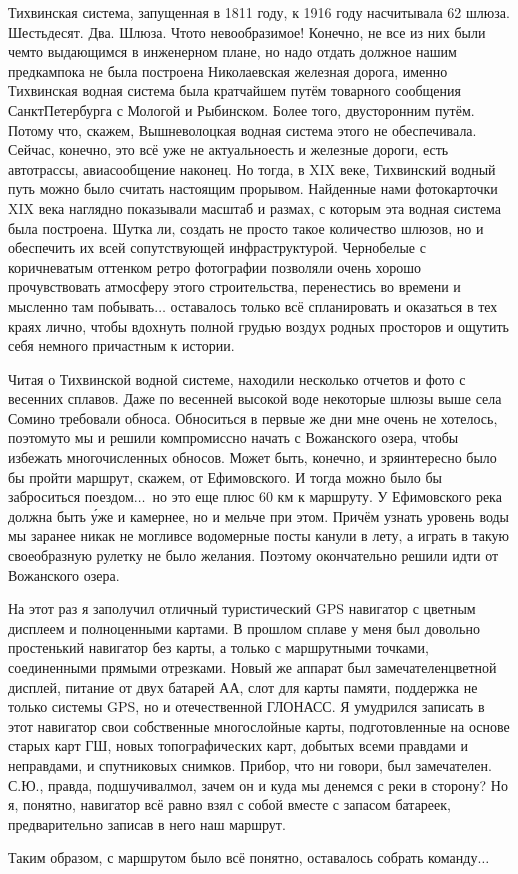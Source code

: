 Тихвинская система, запущенная в 1811 году, к 1916 году насчитывала 62 шлюза. Шестьдесят. Два. Шлюза. Что\sdash то невообразимое! Конечно, не все из них были чем\sdash то выдающимся в инженерном плане, но надо отдать должное нашим предкам\mdash пока не была построена Николаевская железная дорога, именно Тихвинская водная система была кратчайшем путём товарного сообщения Санкт\sdash Петербурга с Мологой и Рыбинском. Более того, двусторонним путём. Потому что, скажем, Вышневолоцкая водная система этого не обеспечивала. Сейчас, конечно, это всё уже не актуально\mdash есть и железные дороги, есть автотрассы, авиасообщение наконец. Но тогда, в XIX веке, Тихвинский водный путь можно было считать настоящим прорывом. Найденные нами фотокарточки XIX века наглядно показывали масштаб и размах, с которым эта водная система была построена. Шутка ли, создать не просто такое количество шлюзов, но и обеспечить их всей сопутствующей инфраструктурой. Черно\sdash белые с коричневатым оттенком ретро фотографии позволяли очень хорошо прочувствовать атмосферу этого строительства, перенестись во времени и мысленно там побывать$\ldots$ оставалось только всё спланировать и оказаться в тех краях лично, чтобы вдохнуть полной грудью воздух родных просторов и ощутить себя немного причастным к истории.

Читая о Тихвинской водной системе, находили несколько отчетов и фото с весенних сплавов. Даже по весенней высокой воде некоторые шлюзы выше села Сомино требовали обноса. Обноситься в первые же дни мне очень не хотелось, поэтому\sdash то мы и решили компромиссно начать с Вожанского озера, чтобы избежать многочисленных обносов. Может быть, конечно, и зря\mdash интересно было бы пройти маршрут, скажем, от Ефимовского. И тогда можно было бы заброситься поездом$\ldots$~но это еще плюс 60 км к маршруту. У Ефимовского река должна быть \'{у}же и камернее, но и мельче при этом. Причём узнать уровень воды мы заранее никак не могли\mdash все водомерные посты канули в лету, а играть в такую своеобразную рулетку не было желания. Поэтому окончательно решили идти от Вожанского озера. 

На этот раз я заполучил отличный туристический GPS навигатор с цветным дисплеем и полноценными картами. В прошлом сплаве у меня был довольно простенький навигатор без карты, а только с маршрутными точками, соединенными прямыми отрезками. Новый же аппарат был замечателен\mdash цветной дисплей, питание от двух батарей АА, слот для карты памяти, поддержка не только системы GPS, но и отечественной ГЛОНАСС. Я умудрился записать в этот навигатор свои собственные многослойные карты, подготовленные на основе старых карт ГШ, новых топографических карт, добытых всеми правдами и неправдами, и спутниковых снимков. Прибор, что ни говори, был замечателен. С.Ю., правда, подшучивал\mdash мол, зачем он и куда мы денемся с реки в сторону?  Но я, понятно, навигатор всё равно взял с собой вместе с запасом батареек, предварительно записав в него наш маршрут.

Таким образом, с маршрутом было всё понятно, оставалось собрать команду$\ldots$

\begin{center}
\end{center}
